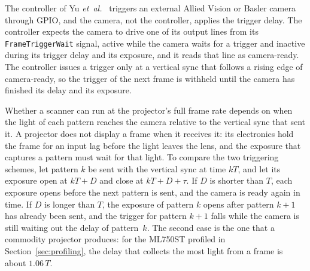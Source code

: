 \documentclass[10pt,journal,compsoc]{IEEEtran}
\begin{document}
The controller of Yu \emph{et~al.}~\cite{yu2020dualprojector} triggers an external Allied Vision
or Basler camera through GPIO, and the camera, not the controller, applies the trigger delay. The
controller expects the camera to drive one of its output lines from its \texttt{FrameTriggerWait}
signal, active while the camera waits for a trigger and inactive during its trigger delay and its
exposure, and it reads that line as camera-ready. The
controller issues a trigger only at a vertical sync that follows a rising edge of camera-ready,
so the trigger of the next frame is withheld until the camera has finished its delay and its
exposure.

Whether a scanner can run at the projector's full frame rate depends on when the light of each
pattern reaches the camera relative to the vertical sync that sent it. A projector does not
display a frame when it receives it: its electronics hold the frame for an input lag before the
light leaves the lens, and the exposure that captures a pattern must wait for that light. To
compare the two triggering schemes, let pattern $k$ be sent with the vertical sync at time $kT$,
and let its exposure open at $kT+D$ and close at $kT+D+\tau$. If $D$ is shorter than $T$, each
exposure opens before the next pattern is sent, and the camera is ready again in time. If $D$
is longer than $T$, the exposure of pattern $k$ opens after pattern $k+1$ has already been sent,
and the trigger for pattern $k+1$ falls while the camera is still waiting out the delay of
pattern~$k$. The second case is the one that a commodity projector produces: for the ML750ST
profiled in Section~\ref{sec:profiling}, the delay that collects the most light from a frame is
about $1.06\,T$.
\end{document}

